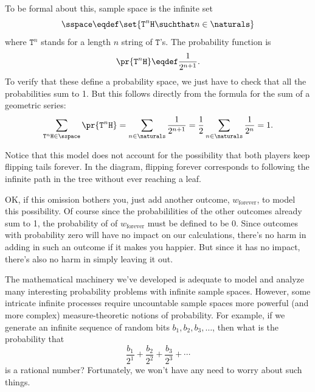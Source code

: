 To be formal about this, sample space is the infinite set
\[
\sspace \eqdef \set{\mathtt{T}^n\mathtt{H} \suchthat n \in \naturals}
\]
where $\mathtt{T}^n$ stands for a length $n$ string of $\mathtt{T}$'s.
The probability function is
\[
\pr{\mathtt{T}^n\mathtt{H}} \eqdef \frac{1}{2^{n+1}}.
\]
To verify that these define a probability space, we just have to check
that all the probabilities sum to 1.  But this follows directly from the
formula for the sum of a geometric series:
\[
\sum_{\mathtt{T}^n\mathtt{H} \in \sspace} \pr{\mathtt{T}^n\mathtt{H}} =
\sum_{n \in \naturals} \frac{1}{2^{n+1}} = \frac{1}{2}\sum_{n \in
  \naturals} \frac{1}{2^n} = 1.
\]

Notice that this model does not account for the possibility that both
players keep flipping tails forever.  In the diagram, flipping forever
corresponds to following the infinite path in the tree without ever
reaching a leaf.

OK, if this omission bothers you, just add another outcome,
$w_{\text{forever}}$, to model this possibility.  Of course since the
probabililities of the other outcomes already sum to 1, the probability of
of $w_{\text{forever}}$ must be defined to be 0.  Since outcomes with
probability zero will have no impact on our calculations, there's no harm
in adding in such an outcome if it makes you happier.  But since it has no
impact, there's also no harm in simply leaving it out.

The mathematical machinery we've developed is adequate to model and
analyze many interesting probability problems with infinite sample spaces.
However, some intricate infinite processes require uncountable sample
spaces more powerful (and more complex) measure-theoretic notions of
probability.  For example, if we generate an infinite sequence of random
bits $b_1, b_2, b_3, \ldots$, then what is the probability that
\[
\frac{b_1}{2^1} + \frac{b_2}{2^2} + \frac{b_3}{2^3} + \cdots
\]
is a rational number?  Fortunately, we won't have any need to worry about
such things.





